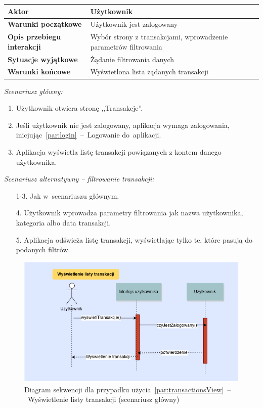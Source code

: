 \begin{longtable}{|p{5cm}|p{7cm}|}
  \hline \textbf{Aktor} & Użytkownik \\
  \hline \textbf{Warunki początkowe} & Użytkownik jest zalogowany \\
  \hline \textbf{Opis przebiegu interakcji} & Wybór strony z transakcjami, wprowadzenie parametrów filtrowania \\
  \hline \textbf{Sytuacje wyjątkowe} & Żądanie filtrowania danych \\
  \hline \textbf{Warunki końcowe} & Wyświetlona lista żądanych transakcji \\
  \hline
\end{longtable}

\noindent \textit{Scenariusz główny:}
\begin{enumerate}
  \item Użytkownik otwiera stronę ,,Transakcje''.
  \item Jeśli użytkownik nie jest zalogowany, aplikacja wymaga zalogowania, inicjując~\ref{par:login}~--~Logowanie do~aplikacji.
  \item Aplikacja wyświetla listę transakcji powiązanych z kontem danego użytkownika.
\end{enumerate}

\noindent \textit{Scenariusz alternatywny -- filtrowanie transakcji:}
\begin{enumerate}
  \item[1-3.] Jak w~scenariuszu głównym.
  \item[4.] Użytkownik wprowadza parametry filtrowania jak nazwa użytkownika, kategoria albo data transakcji.
  \item[5.] Aplikacja odświeża listę transakcji, wyświetlając tylko te, które pasują do podanych filtrów.
\end{enumerate}

\begin{figure}[H]
  \includegraphics[width=\textwidth]{images/wyswietl_transakcje.png}
  \caption{Diagram sekwencji dla przypadku użycia~\ref{par:transactionsView}~--~Wyświetlenie listy transakcji (scenariusz główny)}
\end{figure}


